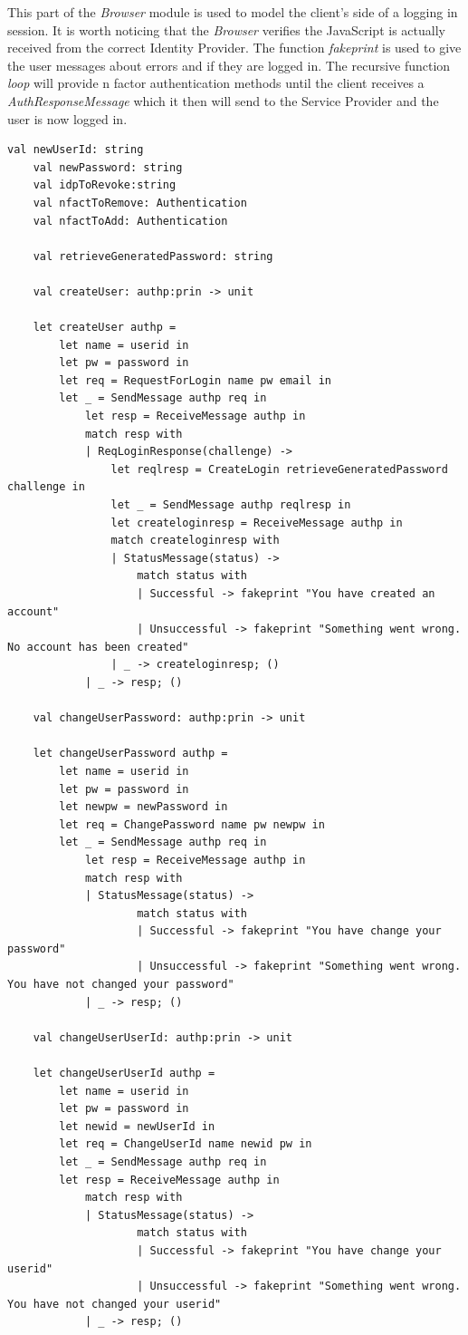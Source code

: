 \documentclass[twosided]{report}
\begin{document}
This part of the \emph{Browser} module is used to model the client's side of a logging in session. It is worth noticing that the \emph{Browser} verifies the JavaScript is actually received from the correct Identity Provider. The function \emph{fakeprint} is used to give the user messages about errors and if they are logged in. The recursive function \emph{loop} will provide n factor authentication methods until the client receives a \emph{AuthResponseMessage} which it then will send to the Service Provider and the user is now logged in.
\begin{lstlisting}[style=fstar, caption={The Browser's side of the account creation and changing}]
	val newUserId: string
	val newPassword: string
	val idpToRevoke:string
	val nfactToRemove: Authentication
	val nfactToAdd: Authentication

	val retrieveGeneratedPassword: string

	val createUser: authp:prin -> unit
	
	let createUser authp =
		let name = userid in
		let pw = password in
		let req = RequestForLogin name pw email in
		let _ = SendMessage authp req in
			let resp = ReceiveMessage authp in
			match resp with
			| ReqLoginResponse(challenge) ->
				let reqlresp = CreateLogin retrieveGeneratedPassword challenge in
				let _ = SendMessage authp reqlresp in
				let createloginresp = ReceiveMessage authp in
				match createloginresp with
				| StatusMessage(status) ->
					match status with
					| Successful -> fakeprint "You have created an account"
					| Unsuccessful -> fakeprint "Something went wrong. No account has been created"
				| _ -> createloginresp; ()
			| _ -> resp; ()

	val changeUserPassword: authp:prin -> unit

	let changeUserPassword authp =
		let name = userid in
		let pw = password in
		let newpw = newPassword in
		let req = ChangePassword name pw newpw in
		let _ = SendMessage authp req in
			let resp = ReceiveMessage authp in
			match resp with
			| StatusMessage(status) ->
					match status with
					| Successful -> fakeprint "You have change your password"
					| Unsuccessful -> fakeprint "Something went wrong. You have not changed your password"
			| _ -> resp; ()

	val changeUserUserId: authp:prin -> unit

	let changeUserUserId authp =
		let name = userid in
		let pw = password in
		let newid = newUserId in
		let req = ChangeUserId name newid pw in
		let _ = SendMessage authp req in
		let resp = ReceiveMessage authp in
			match resp with
			| StatusMessage(status) ->
					match status with
					| Successful -> fakeprint "You have change your userid"
					| Unsuccessful -> fakeprint "Something went wrong. You have not changed your userid"
			| _ -> resp; ()


\end{lstlisting}
\end{document}
